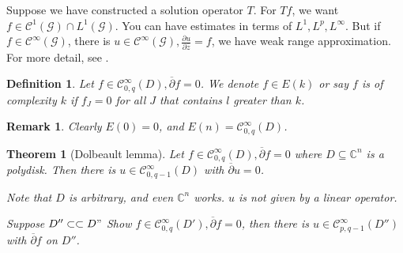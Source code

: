 \documentclass{article}
\newtheorem{theorem}{Theorem} [section]
\newtheorem{definition}{Definition}[section]
\newtheorem{remark}{Remark}[section]
\newcommand{\C}[0]{\mathbb{C}}
\newcommand{\G}[0]{\mathcal{G}}
\newcommand{\pd}[2]{{\frac {\partial#1} {\partial#2}}}
\newcommand{\compembed}[0]{\subset\subset}
\begin{document}
Suppose we have constructed a solution operator $T$. For $Tf$, we want $f\in\mathcal{C}^1(\G)\cap L^1(\G)$. You can have estimates in terms of $L^1,L^p,L^\infty$. But if $f\in\mathcal{C}^\infty(\G)$, there is $u\in\mathcal{C}^\infty(\G), \pd{u}{\overline{z}}=f$, we have weak range approximation. For more detail, see \cite{Lieb}.

\begin{definition}
  Let $f\in\mathcal{C}^\infty_{0,q}(D),\overline{\partial}f = 0$. We denote $f\in E(k)$ or say $f$ is of complexity $k$ if $f_J=0$ for all $J$ that contains $l$ greater than $k$.
\end{definition}

\begin{remark}
  Clearly $E(0) = 0$, and $E(n)=\mathcal{C}^\infty_{0,q}(D)$.
\end{remark}

\begin{theorem}[Dolbeault lemma]
  \label{lemma_dolbeault}
  Let $f\in\mathcal{C}^\infty_{0,q}(D),\overline{\partial}f = 0$ where $D\subseteq\C^n$ is a polydisk. Then there is $u\in\mathcal{C}^\infty_{0,q-1}(D)$ with $\overline{\partial}u=0$. 
  \par Note that $D$ is arbitrary, and even $\C^n$ works. $u$ is not given by a linear operator.
  \par Suppose $D''\compembed D"$ Show $f\in\mathcal{C}^\infty_{0,q}(D'),\overline{\partial}f=0$, then there is $u\in\mathcal{C}_{p,q-1}^\infty (D'')$ with $\overline{\partial}f$ on $D''$.
\end{theorem} 
\end{document}
